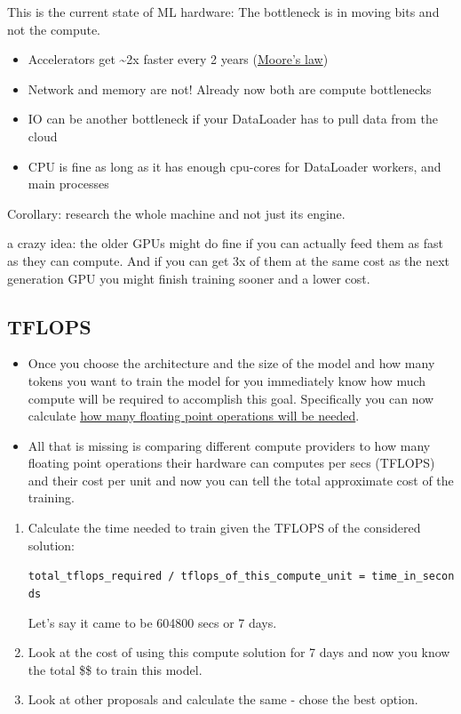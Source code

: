 \documentclass[
]{report}
\providecommand{\tightlist}{%
  \setlength{\itemsep}{0pt}\setlength{\parskip}{0pt}}\usepackage{longtable,booktabs,array}
\begin{document}
This is the current state of ML hardware: The bottleneck is in moving
bits and not the compute.

\begin{itemize}
\tightlist
\item
  Accelerators get \textasciitilde2x faster every 2 years
  (\href{https://en.wikipedia.org/wiki/Moore\%27s_law}{Moore's law})
\item
  Network and memory are not! Already now both are compute bottlenecks
\item
  IO can be another bottleneck if your DataLoader has to pull data from
  the cloud
\item
  CPU is fine as long as it has enough cpu-cores for DataLoader workers,
  and main processes
\end{itemize}

Corollary: research the whole machine and not just its engine.

a crazy idea: the older GPUs might do fine if you can actually feed them
as fast as they can compute. And if you can get 3x of them at the same
cost as the next generation GPU you might finish training sooner and a
lower cost.

\subsection{TFLOPS}\label{tflops}

\begin{itemize}
\item
  Once you choose the architecture and the size of the model and how
  many tokens you want to train the model for you immediately know how
  much compute will be required to accomplish this goal. Specifically
  you can now calculate
  \href{../training/performance/README.md\#tflops-as-a-performance-metric}{how
  many floating point operations will be needed}.
\item
  All that is missing is comparing different compute providers to how
  many floating point operations their hardware can computes per secs
  (TFLOPS) and their cost per unit and now you can tell the total
  approximate cost of the training.
\end{itemize}

\begin{enumerate}
\def\labelenumi{\arabic{enumi}.}
\item
  Calculate the time needed to train given the TFLOPS of the considered
  solution:

  \texttt{total\_tflops\_required\ /\ tflops\_of\_this\_compute\_unit\ =\ time\_in\_seconds}

  Let's say it came to be 604800 secs or 7 days.
\item
  Look at the cost of using this compute solution for 7 days and now you
  know the total \$\$ to train this model.
\item
  Look at other proposals and calculate the same - chose the best
  option.
\end{enumerate}
\end{document}
